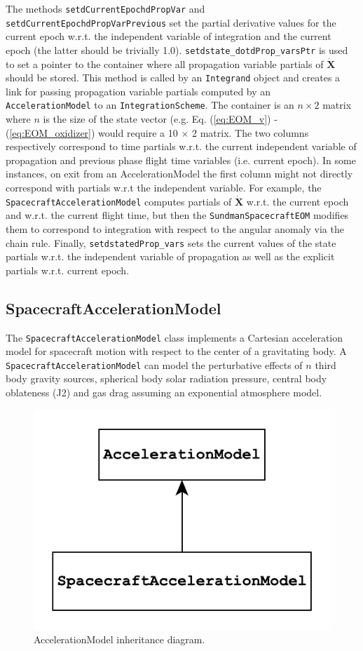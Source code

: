 The methods \texttt{setdCurrentEpochdPropVar} and \texttt{setdCurrentEpochdPropVarPrevious} set the partial derivative values for the current epoch w.r.t. the independent variable of integration and the current epoch (the latter should be trivially 1.0). \texttt{setdstate\_dotdProp\_varsPtr} is used to set a pointer to the container where all propagation variable partials of $\dot{\mathbf{X}}$ should be stored. This method is called by an \texttt{Integrand} object and creates a link for passing propagation variable partials computed by an \texttt{AccelerationModel} to an \texttt{IntegrationScheme}. The container is an $n\times2$ matrix where $n$ is the size of the state vector (e.g. Eq. (\ref{eq:EOM_v}) - (\ref{eq:EOM_oxidizer}) would require a 10 $\times$ 2 matrix. The two columns respectively correspond to time partials w.r.t. the current independent variable of propagation and previous phase flight time variables (i.e. current epoch). In some instances, on exit from an AccelerationModel the first column might not directly correspond with partials w.r.t the independent variable. For example, the \texttt{SpacecraftAccelerationModel} computes partials of $\dot{\mathbf{X}}$ w.r.t. the current epoch and w.r.t. the current flight time, but then the \texttt{SundmanSpacecraftEOM} modifies them to correspond to integration with respect to the angular anomaly via the chain rule. Finally, \texttt{setdstatedProp\_vars} sets the current values of the state partials w.r.t. the independent variable of propagation as well as the explicit partials w.r.t. current epoch.

\subsection{SpacecraftAccelerationModel}
\label{sec:spacecraft_acceleration_model}

The \texttt{SpacecraftAccelerationModel} class implements a Cartesian acceleration model for spacecraft motion with respect to the center of a gravitating body. A \texttt{SpacecraftAccelerationModel} can model the perturbative effects of $n$ third body gravity sources, spherical body solar radiation pressure, central body oblateness (J2) and gas drag assuming an exponential atmosphere model.

\begin{figure}[h!]
    \centering
    \includegraphics[width=0.3\linewidth]{./astrodynamics/AccelerationModel_inheritance.pdf}
    \caption{\label{fig:AccelerationModel_inheritance} AccelerationModel inheritance diagram.}
\end{figure} 

